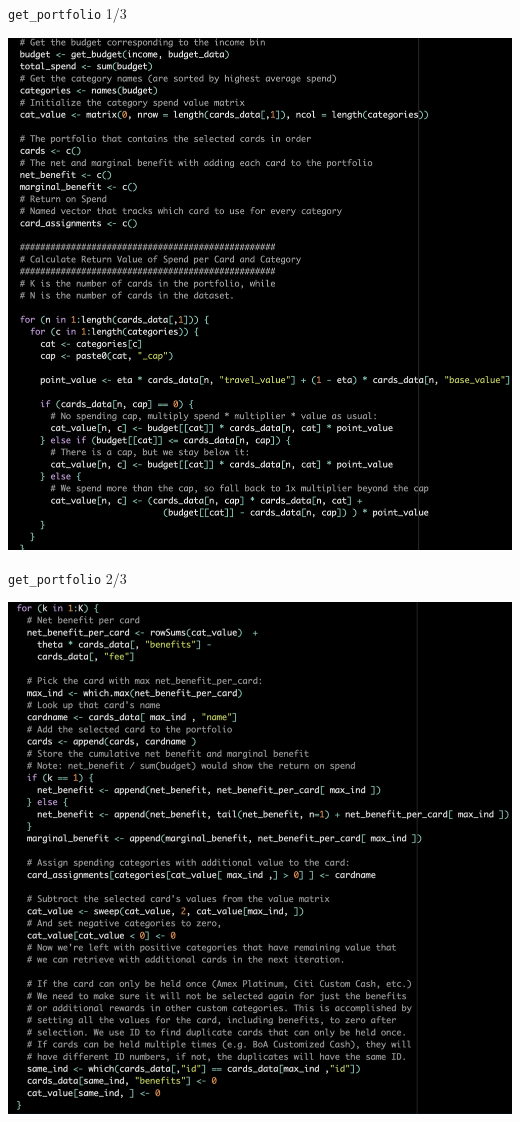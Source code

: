 \begin{frame}{\texttt{get\_portfolio} 1/3}
    \begin{center}
        \includegraphics[width=0.9\textheight]{../Misc/RCode_portfolio1.png}
    \end{center}
\end{frame} 
\begin{frame}{\texttt{get\_portfolio} 2/3}
    \begin{center}
        \includegraphics[width=0.9\textheight]{../Misc/RCode_portfolio2.png}
    \end{center}
\end{frame} 
